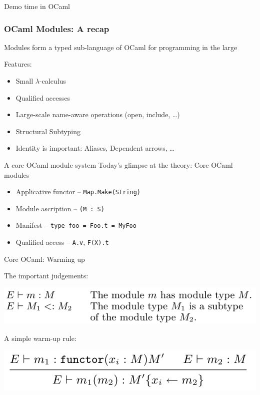 \documentclass[aspectratio=169,dvipsnames,svgnames,10pt]{beamer}
\begin{document}
\begin{frame}
  \centering\Huge Demo time in OCaml
\end{frame}

\begin{frame}
  \frametitle{OCaml Modules: A recap}

  Modules form a typed sub-language of OCaml for programming in the large

  Features:
  \begin{itemize}
  \item Small $\lambda$-calculus
  \item Qualified accesses
  \item Large-scale name-aware operations (open, include, \dots)
  \item Structural Subtyping
  \item Identity is important: Aliases, Dependent arrows, \dots
  \end{itemize}
  
\end{frame}

\begin{frame}[fragile]{A core OCaml module system}
  Today's glimpse at the theory: Core OCaml modules \citep{Leroy94,Leroy95,Leroy96}
  \begin{itemize}
  \item Applicative functor -- \texttt{Map.Make(String)}
  \item Module ascription -- \texttt{(M : S)}
  \item Manifest -- \texttt{type foo = Foo.t = MyFoo}
  \item Qualified access -- \texttt{A.v}, \texttt{F(X).t}
  \end{itemize}
\end{frame}

\begin{frame}{Core OCaml: Warming up}

  The important judgements:
  \begin{center}
  \includegraphics[width=0.6\linewidth]{judgements.png}
\end{center}

  A simple warm-up rule:
  \begin{center}
  \includegraphics[width=0.6\linewidth]{betared.png}
\end{center}
  
\end{frame}
\end{document}
